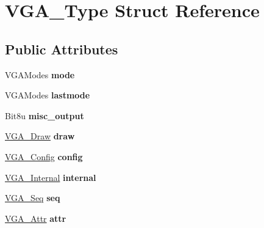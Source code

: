 \hypertarget{structVGA__Type}{\section{V\-G\-A\-\_\-\-Type Struct Reference}
\label{structVGA__Type}
}
\subsection*{Public Attributes}
\begin{DoxyCompactItemize}
\item 
\hypertarget{structVGA__Type_a44fe81559bf3a4c349f8a9759b527a35}{V\-G\-A\-Modes {\bfseries mode}}\label{structVGA__Type_a44fe81559bf3a4c349f8a9759b527a35}

\item 
\hypertarget{structVGA__Type_aa49e9fe907d3d3772a4045c03a442e27}{V\-G\-A\-Modes {\bfseries lastmode}}\label{structVGA__Type_aa49e9fe907d3d3772a4045c03a442e27}

\item 
\hypertarget{structVGA__Type_a1d41608f9c718ba6b7214280a1ef5f42}{Bit8u {\bfseries misc\-\_\-output}}\label{structVGA__Type_a1d41608f9c718ba6b7214280a1ef5f42}

\item 
\hypertarget{structVGA__Type_ae457a2c4a9d5c9f6f44446fb3f55821e}{\hyperlink{structVGA__Draw}{V\-G\-A\-\_\-\-Draw} {\bfseries draw}}\label{structVGA__Type_ae457a2c4a9d5c9f6f44446fb3f55821e}

\item 
\hypertarget{structVGA__Type_a0038dc10fed9d08aa6bfae50ecf37ff1}{\hyperlink{structVGA__Config}{V\-G\-A\-\_\-\-Config} {\bfseries config}}\label{structVGA__Type_a0038dc10fed9d08aa6bfae50ecf37ff1}

\item 
\hypertarget{structVGA__Type_a24ba9a206ab7c173bf2efb041f96dde7}{\hyperlink{structVGA__Internal}{V\-G\-A\-\_\-\-Internal} {\bfseries internal}}\label{structVGA__Type_a24ba9a206ab7c173bf2efb041f96dde7}

\item 
\hypertarget{structVGA__Type_ad27712fc3d8783827ec3a4a546175f7a}{\hyperlink{structVGA__Seq}{V\-G\-A\-\_\-\-Seq} {\bfseries seq}}\label{structVGA__Type_ad27712fc3d8783827ec3a4a546175f7a}

\item 
\hypertarget{structVGA__Type_a9529f45fad1c31a2ee8b140f42c0d3ca}{\hyperlink{structVGA__Attr}{V\-G\-A\-\_\-\-Attr} {\bfseries attr}}\label{structVGA__Type_a9529f45fad1c31a2ee8b140f42c0d3ca}


\end{DoxyCompactItemize}
